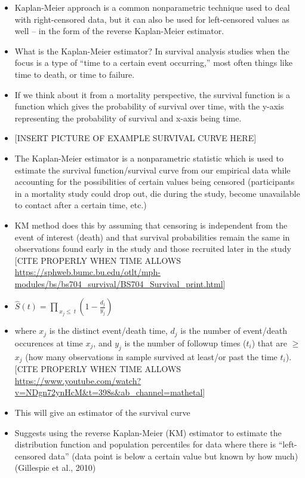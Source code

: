\documentclass[12pt, twoside]{amherstthesis}
\begin{document}
\begin{itemize}
\item
  Kaplan-Meier approach is a common nonparametric technique used to deal with right-censored data, but it can also be used for left-censored values as well -- in the form of the reverse Kaplan-Meier estimator.
\item
  What is the Kaplan-Meier estimator? In survival analysis studies when the focus is a type of ``time to a certain event occurring,'' most often things like time to death, or time to failure.
\item
  If we think about it from a mortality perspective, the survival function is a function which gives the probability of survival over time, with the y-axis representing the probability of survival and x-axis being time.
\item
  {[}INSERT PICTURE OF EXAMPLE SURVIVAL CURVE HERE{]}
\item
  The Kaplan-Meier estimator is a nonparametric statistic which is used to estimate the survival function/survival curve from our empirical data while accounting for the possibilities of certain values being censored (participants in a mortality study could drop out, die during the study, become unavailable to contact after a certain time, etc.)
\item
  KM method does this by assuming that censoring is independent from the event of interest (death) and that survival probabilities remain the same in observations found early in the study and those recruited later in the study {[}CITE PROPERLY WHEN TIME ALLOWS \url{https://sphweb.bumc.bu.edu/otlt/mph-modules/bs/bs704_survival/BS704_Survival_print.html}{]}
\item
  \(\hat{S}(t) = \prod_{\ x_j \le \ t }(1-\frac{d_j}{y_j})\)
\item
  where \(x_j\) is the distinct event/death time, \(d_j\) is the number of event/death occurences at time \(x_j\), and \(y_j\) is the number of followup times (\(t_i\)) that are \(\ge\) \(x_j\) (how many observations in sample survived at least/or past the time \(t_i\)). {[}CITE PROPERLY WHEN TIME ALLOWS \url{https://www.youtube.com/watch?v=NDgn72ynHcM\&t=398s\&ab_channel=mathetal}{]}
\item
  This will give an estimator of the survival curve
\item
  Suggests using the reverse Kaplan-Meier (KM) estimator to estimate the distribution function and population percentiles for data where there is ``left-censored data'' (data point is below a certain value but known by how much) (Gillespie et al., 2010)

\end{itemize}
\end{document}
